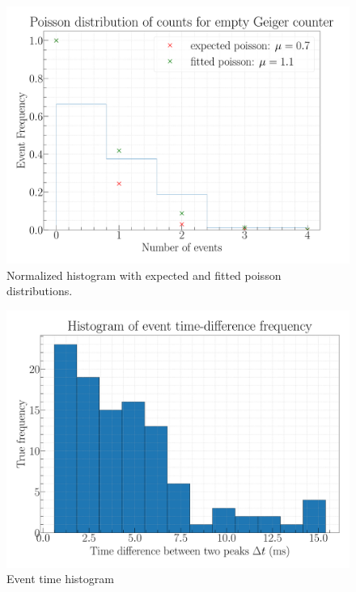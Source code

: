 \begin{figure}[H]
\centering
\includegraphics[width=\textwidth]{../Figures/Geiger_poisson_fit.pdf}
\caption{Normalized histogram with expected and fitted poisson distributions.}
\label{fig:PoissonFit}
\end{figure}

\begin{figure}[H]
\centering
\includegraphics[width=\textwidth]{../Figures/Geiger_eventtime_histogram_unnormalized.pdf}
\caption{Event time histogram}
\label{fig:ExpFit}
\end{figure}

